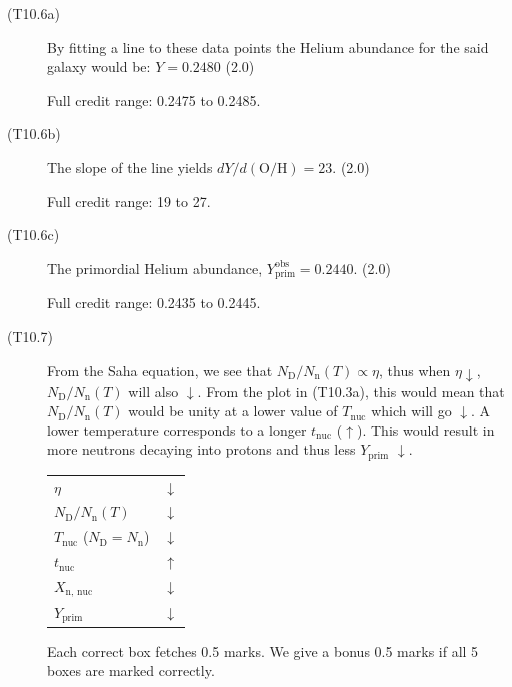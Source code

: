 \begin{description}
\item[(T10.6a)] By fitting a line to these data points the Helium
  abundance for the said galaxy would be: $Y = 0.2480$ \hfill(2.0)

  Full credit range: 0.2475 to 0.2485.

\item[(T10.6b)] The slope of the line yields
  $dY/d(\mathrm{O/H}) = 23$. \hfill(2.0)

  Full credit range: 19 to 27.

\item[(T10.6c)] The primordial Helium abundance,
  $Y_{\mathrm{prim}}^{\mathrm{obs}} = 0.2440$. \hfill(2.0)

  Full credit range: 0.2435 to 0.2445.

\item[(T10.7)] From the Saha equation, we see that
  $N_{\mathrm{D}}/N_{\mathrm{n}}(T) \propto \eta$, thus when
  $\eta\downarrow$, $N_{\mathrm{D}}/N_{\mathrm{n}}(T)$ will also
  $\downarrow$. From the plot in (T10.3a), this would mean that
  $N_{\mathrm{D}}/N_{\mathrm{n}}(T)$ would be unity at a lower value of
  $T_{\mathrm{nuc}}$ which will go $\downarrow$. A lower temperature
  corresponds to a longer $t_{\mathrm{nuc}}$ ($\uparrow$). This would
  result in more neutrons decaying into protons and thus less
  $Y_{\mathrm{prim}}$ $\downarrow$.

  \begin{center}
  \begin{tabular}{ll}
  $\eta$ & $\downarrow$\\
  $N_{\mathrm{D}}/N_{\mathrm{n}}(T)$ & $\downarrow$\\
  $T_{\mathrm{nuc}}$ ($N_{\mathrm{D}} = N_{\mathrm{n}}$) & $\downarrow$\\
  $t_{\mathrm{nuc}}$ & $\uparrow$\\
  $X_{\mathrm{n,\,nuc}}$ & $\downarrow$\\
  $Y_{\mathrm{prim}}$ & $\downarrow$
  \end{tabular}
  \end{center}

  Each correct box fetches 0.5 marks. We give a bonus 0.5 marks if all 5
  boxes are marked correctly.
\end{description}

